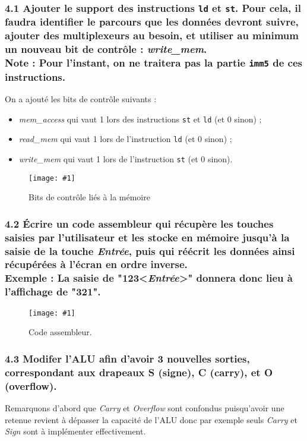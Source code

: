 \documentclass[twoside, 12pt, a4paper]{article}
\newcommand{\cf}[3]{
    \begin{figure}[!hbt]
        \centering
        \texttt{[image: \#1]}
    \caption{#3}\label{Fig:#1}
    \end{figure}
}
\newcommand{\hcf}[2]{\cf{#1}{.75}{#2}}
\begin{document}
        \subsubsection*{\textbf{4.1} Ajouter le support des instructions \texttt{ld} et \texttt{st}. Pour cela, il faudra identifier le parcours que les données devront suivre, ajouter des multiplexeurs au besoin, et utiliser au minimum un nouveau bit de contrôle : \textit{write\_mem}.\\
        \textbf{Note : } Pour l'instant, on ne traitera pas la partie \texttt{imm5} de ces instructions.}

On a ajouté les bits de contrôle suivants :
\begin{itemize}
    \item \textit{mem\_access} qui vaut 1 lors des instructions \texttt{st} et \texttt{ld} (et 0 sinon) ;
    \item \textit{read\_mem} qui vaut 1 lors de l'instruction \texttt{ld} (et 0 sinon) ;
    \item \textit{write\_mem} qui vaut 1 lors de l'instruction \texttt{st} (et 0 sinon).
\end{itemize}

\hcf{ctrl_mem.png}{Bits de contrôle liés à la mémoire}

        \subsubsection*{\textbf{4.2} Écrire un code assembleur qui récupère les touches saisies par l'utilisateur et les stocke en mémoire jusqu'à la saisie de la touche \textit{Entrée}, puis qui réécrit les données ainsi récupérées à l'écran en ordre inverse. \\
        \textbf{Exemple : } La saisie de "123<\textit{Entrée}>" donnera donc lieu à l'affichage de "321".}

\hcf{150.png}{Code assembleur.}
        
        \subsubsection*{\textbf{4.3} Modifer l'ALU afin d'avoir 3 nouvelles sorties, correspondant aux drapeaux S (signe), C (carry), et O (overflow).}

Remarquons d'abord que \textit{Carry} et \textit{Overflow} sont confondus puisqu'avoir une retenue revient à dépasser la capacité de l'ALU donc par exemple seuls \textit{Carry} et \textit{Sign} sont à implémenter effectivement.
\end{document}
